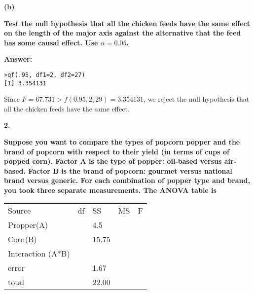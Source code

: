 \documentclass[letterpaper,11pt]{article}
\begin{document}
\begin{addmargin}[-1.1em]{0em}
\textbf{(b)}\par\end{addmargin}
  \textbf{Test the null hypothesis that all the chicken feeds have the same effect on the length of the major axis against the alternative that the feed has some causal effect. Use $\alpha = 0.05$.
}\par
\bigbreak

\begin{addmargin}[-0.5em]{0em}
\textbf{Answer: }\end{addmargin}

\begin{lstlisting}
>qf(.95, df1=2, df2=27)
[1] 3.354131
\end{lstlisting}

Since $F = 67.731 > f(0.95, 2, 29) = 3.354131$, we reject the null hypothesis that all the chicken feeds have the same effect.





  \begin{addmargin}[-2em]{0em} \large{\textbf{2. }}\end{addmargin}

  \begin{addmargin}[-1.1em]{0em} \textbf{Suppose you want to compare the types of popcorn popper and the brand of popcorn with respect to their yield (in terms of cups of popped corn). Factor A is the type of popper: oil-based versus air-based. Factor B is the brand of popcorn: gourmet versus national brand versus generic. For each combination of popper type and brand, you took three separate measurements. The ANOVA table is}\par\end{addmargin}

    \begin{center}
    \begin{tabular}{ p{5cm}p{1cm}p{1cm}p{1cm}p{1cm}}
    \centering Source & df & SS & MS & F\\
    \centering Propper(A) & {} & 4.5 & {} &\\
    \centering Corn(B) & {} & 15.75 & {} & {}\\
    \centering Interaction (A*B) & {} & {} & {} & {}\\
    \centering error & {} & 1.67 & {} & {}\\
    \centering total & {} & 22.00 & {} & {}\\
    \end{tabular}
    \end{center}
\end{document}
